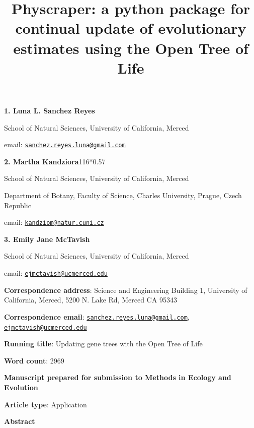\documentclass[]{article}
\title{Physcraper: a python package for continual update of evolutionary estimates using the Open Tree of Life}
\author{}
\date{\vspace{-2.5em}}
\begin{document}
\maketitle

\textbf{1. Luna L. Sanchez Reyes}

School of Natural Sciences, University of California, Merced

email: \href{mailto:sanchez.reyes.luna@gmail.com}{\nolinkurl{sanchez.reyes.luna@gmail.com}}

\textbf{2. Martha Kandziora}116*0.57

School of Natural Sciences, University of California, Merced

Department of Botany, Faculty of Science, Charles University, Prague, Czech Republic

email: \href{mailto:kandziom@natur.cuni.cz}{\nolinkurl{kandziom@natur.cuni.cz}}

\textbf{3. Emily Jane McTavish}

School of Natural Sciences, University of California, Merced

email: \href{mailto:ejmctavish@ucmerced.edu}{\nolinkurl{ejmctavish@ucmerced.edu}}

\textbf{Correspondence address}: Science and Engineering Building 1, University of California, Merced, 5200 N. Lake Rd, Merced CA 95343

\textbf{Correspondence email}: \href{mailto:sanchez.reyes.luna@gmail.com}{\nolinkurl{sanchez.reyes.luna@gmail.com}}, \href{mailto:ejmctavish@ucmerced.edu}{\nolinkurl{ejmctavish@ucmerced.edu}}

\textbf{Running title}: Updating gene trees with the Open Tree of Life

\textbf{Word count}: 2969

\textbf{Manuscript prepared for submission to Methods in Ecology and Evolution}

\textbf{Article type}: Application

\newpage

\begingroup\Large

\textbf{Abstract}
\endgroup
\end{document}
